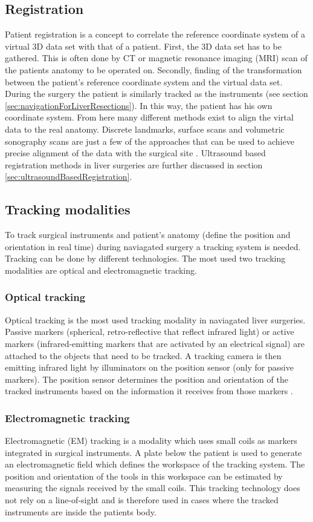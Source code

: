 \subsection{Registration}
Patient registration is a concept to correlate the reference coordinate system
of a virtual 3D data set with that of a patient. First, the 3D data set has to
be gathered. This is often done by CT or magnetic resonance imaging (MRI) scan of the patients anatomy to be
operated on. Secondly, finding of the transformation between the patient's
reference coordinate system and the virtual data set. During the surgery the patient is similarly
tracked as the instruments (see section \ref{sec:navigationForLiverResections}).
In this way, the patient has his own coordinate system. From here many different
methods exist to align the virtal data to the real anatomy.
Discrete landmarks, surface scans and
volumetric sonography scans are just a few of the approaches that can be
used to achieve precise alignment of the data with the
surgical site \cite{banz2016intraoperative}. Ultrasound based registration
methods in liver surgeries are further discussed in section
\ref{sec:ultrasoundBasedRegistration}.

\subsection{Tracking modalities}
To track surgical instruments and patient's anatomy (define the position and
orientation in real time) during naviagated surgery a tracking system is needed.
Tracking can be done by different technologies. The most used two tracking
modalities are optical and electromagnetic tracking.   

\subsubsection{Optical tracking}
Optical tracking is the most used tracking modality in naviagated liver
surgeries. Passive markers (spherical, retro-reflective that reflect infrared
light) or active markers (infrared-emitting markers that are activated by an
electrical signal) \cite{wiles2004accuracy} are attached to the objects that
need to be tracked. A tracking camera is then emitting infrared light by illuminators
on the position sensor (only for passive markers). The position sensor
determines the position and orientation of the tracked instruments based on the
information it receives from those markers \cite{noauthor_polaris_nodate}.  

\subsubsection{Electromagnetic tracking}
Electromagnetic (EM) tracking is a modality which uses small coils as markers
integrated in surgical instruments. A plate below the patient is used to
generate an electromagnetic field which defines the workspace of the tracking
system. The position and orientation of the tools in this workspace can be
estimated by measuring the signals received by the small coils. This tracking technology does not rely on a
line-of-sight and is therefore used in cases where the tracked instruments are
inside the patients body.  
\endinput
